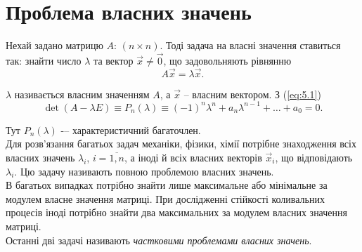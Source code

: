 \section{Проблема власних значень}

Нехай задано матрицю $A$: $(n \times n)$. Тоді задача на власні значення ставиться так: знайти число $\lambda$ та вектор $\vec x \ne \vec 0$, що задовольняють рівнянню
\begin{equation}
	\label{eq:5.1}
	A \vec x = \lambda \vec x.
\end{equation}

$\lambda$ називається власним значенням $A$, а $\vec x$ -- власним вектором. З (\ref{eq:5.1}) \[ \det (A - \lambda E) \equiv P_n(\lambda) \equiv (-1)^n \lambda^n + a_n \lambda^{n-1} + \ldots + a_0 = 0. \]

Тут $P_n(\lambda)$ -– характеристичний багаточлен. \\

Для розв’язання багатьох задач механіки, фізики, хімії потрібне знаходження всіх власних значень $\lambda_i$, $i=\overline{1,n}$, а іноді й всіх власних векторів $\vec x_i$, що відповідають $\lambda_i$. Цю задачу називають повною проблемою власних значень. \\

В багатьох випадках потрібно знайти лише максимальне або мінімальне за модулем власне значення матриці. При дослідженні стійкості коливальних процесів іноді потрібно знайти два максимальних за модулем власних значення матриці. \\

Останні дві задачі називають \textit{частковими проблемами власних значень}.


